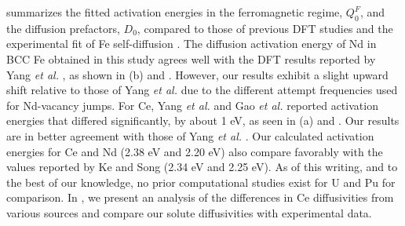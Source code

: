 \documentclass[preprint,12pt]{elsarticle}
\begin{document}
 summarizes the fitted activation energies in the ferromagnetic regime, $Q_0^F$, and the diffusion prefactors, $D_0$, compared to those of previous DFT studies \cite{yang_significant_2023, ke2025diffusion,sandberg2015modeling, GAO2016316} and the experimental fit of Fe self-diffusion \cite{lubbehusen1990self}. 
The diffusion activation energy of Nd in BCC Fe obtained in this study agrees well with the DFT results reported by Yang \textit{et al.} \cite{yang_significant_2023}, as shown in (b) and . However, our results exhibit a slight upward shift relative to those of Yang \textit{et al.} due to the different attempt frequencies used for Nd-vacancy jumps. For Ce, Yang \textit{et al.} \cite{yang_significant_2023} and Gao \textit{et al.} \cite{GAO2016316} reported activation energies that differed significantly, by about 1 eV, as seen in (a) and . Our results are in better agreement with those of Yang \textit{et al.} \cite{yang_significant_2023}. Our calculated activation energies for Ce and Nd (2.38 eV and 2.20 eV) also compare favorably with the values reported by Ke and Song \cite{ke2025diffusion} (2.34 eV and 2.25 eV).
As of this writing, and to the best of our knowledge, no prior computational studies exist for U and Pu for comparison. 
In , we present an analysis of the differences in Ce diffusivities from various sources and compare our solute diffusivities with experimental data.
\end{document}
